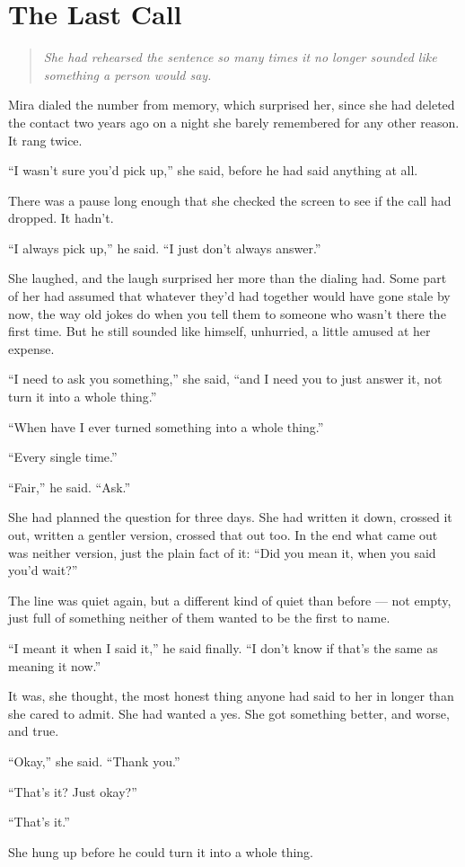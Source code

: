 \chapter{The Last Call}

\begin{quote}
  \itshape
  She had rehearsed the sentence so many times it no longer sounded
  like something a person would say.
\end{quote}

Mira dialed the number from memory, which surprised her, since she had
deleted the contact two years ago on a night she barely remembered for
any other reason. It rang twice.

``I wasn't sure you'd pick up,'' she said, before he had said anything
at all.

There was a pause long enough that she checked the screen to see if
the call had dropped. It hadn't.

``I always pick up,'' he said. ``I just don't always answer.''

She laughed, and the laugh surprised her more than the dialing had.
Some part of her had assumed that whatever they'd had together would
have gone stale by now, the way old jokes do when you tell them to
someone who wasn't there the first time. But he still sounded like
himself, unhurried, a little amused at her expense.

``I need to ask you something,'' she said, ``and I need you to just
answer it, not turn it into a whole thing.''

``When have I ever turned something into a whole thing.''

``Every single time.''

``Fair,'' he said. ``Ask.''

She had planned the question for three days. She had written it down,
crossed it out, written a gentler version, crossed that out too. In
the end what came out was neither version, just the plain fact of it:
``Did you mean it, when you said you'd wait?''

The line was quiet again, but a different kind of quiet than before —
not empty, just full of something neither of them wanted to be the
first to name.

``I meant it when I said it,'' he said finally. ``I don't know if
that's the same as meaning it now.''

It was, she thought, the most honest thing anyone had said to her in
longer than she cared to admit. She had wanted a yes. She got
something better, and worse, and true.

``Okay,'' she said. ``Thank you.''

``That's it? Just okay?''

``That's it.''

She hung up before he could turn it into a whole thing.
